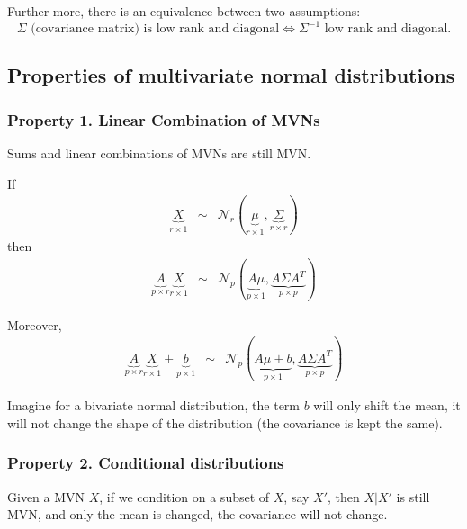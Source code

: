 \documentclass[12pt]{report}
\begin{document}
Further more, there is an equivalence between two assumptions:
\begin{equation}
	\Sigma \,\, \text{(covariance matrix) is low rank and diagonal} \Leftrightarrow \Sigma^{-1} \,\, \text{low rank and diagonal}.
\end{equation}

\subsection{Properties of multivariate normal distributions}

\subsubsection{Property 1. Linear Combination of MVNs}

Sums and linear combinations of MVNs are still MVN.

\vskip 0.1in

If
\begin{eqnarray}
\underbrace{X}_{r \times 1} & \sim & \mathcal{N}_r (\underbrace{\mu}_{r \times 1}, \underbrace{\Sigma}_{r \times r})
\end{eqnarray}
then
\begin{eqnarray}
\underbrace{A}_{p \times r} \underbrace{X}_{r \times 1} & \sim & \mathcal{N}_p (\underbrace{A \mu}_{p \times 1}, \underbrace{A \Sigma A^T}_{p \times p})
\end{eqnarray}

Moreover,
\begin{eqnarray}
\underbrace{A}_{p \times r} \underbrace{X}_{r \times 1} + \underbrace{b}_{p \times 1} & \sim & \mathcal{N}_p (\underbrace{A \mu + b}_{p \times 1}, \underbrace{A \Sigma A^T}_{p \times p})
\end{eqnarray}

Imagine for a bivariate normal distribution, the term $b$ will only shift the mean, it will not change the shape of the distribution (the covariance is kept the same).

\subsubsection{Property 2. Conditional distributions}

Given a MVN $X$, if we condition on a subset of $X$, say $X'$, then $X | X'$ is still MVN, and only the mean is changed, the covariance will not change.

\vskip 0.1in
\end{document}
